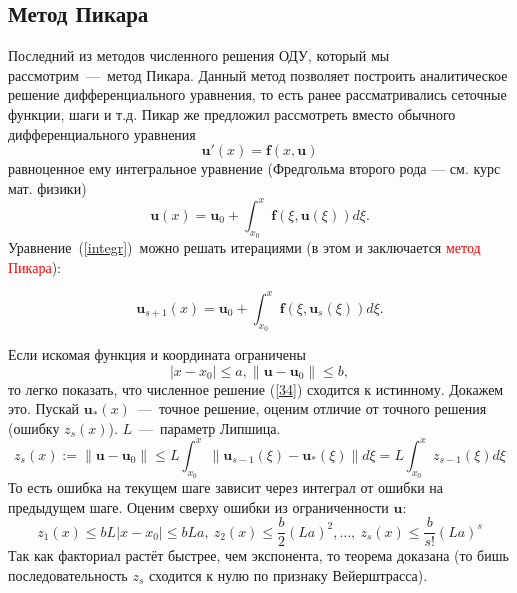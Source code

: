 \documentclass[a4,14pt,russian]{article}
\begin{document}
\subsection{Метод Пикара}
    Последний из методов численного решения ОДУ, который мы рассмотрим~---~метод Пикара. Данный метод позволяет построить аналитическое решение дифференциального уравнения, то есть ранее рассматривались сеточные функции, шаги и т.д. Пикар же предложил рассмотреть вместо обычного дифференциального уравнения
    \begin{equation}
     \boldsymbol u'(x) = \boldsymbol f(x, \boldsymbol u)
    \end{equation}
    равноценное ему интегральное уравнение (Фредгольма второго рода --- см. курс мат. физики)
    \begin{equation}\label{integr}
     \boldsymbol u(x) = \boldsymbol u_0 + \int_{x_0}^x \boldsymbol f(\xi, \boldsymbol u(\xi)) d \xi.
    \end{equation}
    Уравнение~(\ref{integr})~можно решать итерациями (в этом и заключается \textcolor{red}{метод Пикара}):
    
     \begin{equation}\label{34}
     \boldsymbol u_{s+1}(x) = \boldsymbol u_0 + \int_{x_0}^x \boldsymbol f(\xi, \boldsymbol u_s(\xi)) d \xi.
    \end{equation}
    
    Если искомая функция и координата ограничены $$|x - x_0| \le a, \|\boldsymbol u - \boldsymbol u_0\| \le b,$$ то легко показать, что численное решение (\ref{34}) сходится к истинному. Докажем это. Пускай $\boldsymbol u_*(x)$~---~точное решение, оценим отличие от точного решения (ошибку $z_s(x)$). $L$~---~параметр Липшица.
    \begin{equation}
     z_s(x):= \|\boldsymbol u - \boldsymbol u_0\| \le L \int_{x_0}^x \| \boldsymbol u_{s-1}(\xi) - \boldsymbol u_*(\xi)\| d \xi = L \int_{x_0}^x z_{s-1}(\xi) d \xi
    \end{equation}
    То есть ошибка на текущем шаге зависит через интеграл от ошибки на предыдущем шаге. Оценим сверху ошибки из ограниченности $\boldsymbol u$:
    \begin{equation}
     z_1(x) \le b L |x - x_0| \le b L a,\ z_2(x) \le  \frac b2 (L a)^2, \ldots,\ z_s(x) \le  \frac b{s!} (L a)^s
    \end{equation}
    Так как факториал растёт быстрее, чем экспонента, то теорема доказана (то бишь последовательность $z_s$ сходится к нулю по признаку Вейерштрасса).
\end{document}
